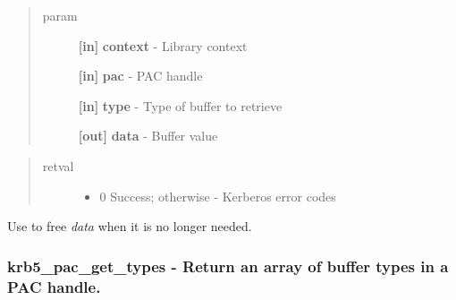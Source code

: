 \documentclass[letterpaper,10pt,english]{sphinxmanual}
\begin{document}
\begin{quote}\begin{description}
\item[{param}] \leavevmode
\textbf{{[}in{]}} \textbf{context} - Library context

\textbf{{[}in{]}} \textbf{pac} - PAC handle

\textbf{{[}in{]}} \textbf{type} - Type of buffer to retrieve

\textbf{{[}out{]}} \textbf{data} - Buffer value

\end{description}\end{quote}
\begin{quote}\begin{description}
\item[{retval}] \leavevmode\begin{itemize}
\item {} 
0   Success; otherwise - Kerberos error codes

\end{itemize}

\end{description}\end{quote}

Use {\hyperref[appdev/refs/api/krb5_free_data_contents:krb5_free_data_contents]{}} to free \emph{data} when it is no longer needed.


\subsubsection{krb5\_pac\_get\_types -  Return an array of buffer types in a PAC handle.}
\label{appdev/refs/api/krb5_pac_get_types:krb5-pac-get-types-return-an-array-of-buffer-types-in-a-pac-handle}\label{appdev/refs/api/krb5_pac_get_types::doc}

\begin{fulllineitems}
\label{appdev/refs/api/krb5_pac_get_types:krb5_pac_get_types}
\end{fulllineitems}
\end{document}

